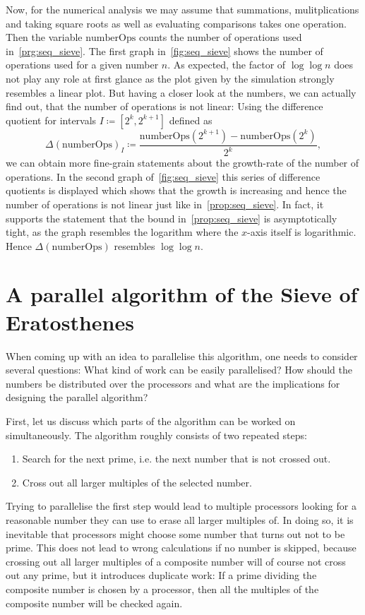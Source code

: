 \documentclass[a4paper,12pt]{article}
\begin{document}
Now, for the numerical analysis we may assume that summations, mulitplications and taking square roots as well as evaluating comparisons takes one operation.
Then the variable $\mathrm{numberOps}$ counts the number of operations used in~\autoref{prg:seq_sieve}.
The first graph in~\autoref{fig:seq_sieve} shows the number of operations used for a given number $n$.
As expected, the factor of $\log\log n$ does not play any role at first glance as the plot given by the simulation strongly resembles a linear plot.
But having a closer look at the numbers, we can actually find out, that the number of operations is not linear:
Using the difference quotient for intervals $I\coloneqq [2^k, 2^{k+1}]$ defined as
\[\Delta(\mathrm{numberOps})_I\coloneqq \frac{\mathrm{numberOps}(2^{k+1}) - \mathrm{numberOps}(2^{k})}{2^k},\]
we can obtain more fine-grain statements about the growth-rate of the number of operations.
In the second graph of~\autoref{fig:seq_sieve} this series of difference quotients is displayed which shows that the growth is increasing and hence the number of operations is not linear just like in~\autoref{prop:seq_sieve}.
In fact, it supports the statement that the bound in~\autoref{prop:seq_sieve} is asymptotically tight, as the graph resembles the logarithm where the $x$-axis itself is logarithmic.
Hence $\Delta(\mathrm{numberOps})$ resembles $\log\log n$.


\section{A parallel algorithm of the Sieve of Eratosthenes}

When coming up with an idea to parallelise this algorithm, one needs to consider several questions:
What kind of work can be easily parallelised?
How should the numbers be distributed over the processors and what are the implications for designing the parallel algorithm?

First, let us discuss which parts of the algorithm can be worked on simultaneously.
The algorithm roughly consists of two repeated steps:
\begin{enumerate}
	\item Search for the next prime, i.e. the next number that is not crossed out.
	\item Cross out all larger multiples of the selected number.
\end{enumerate}
Trying to parallelise the first step would lead to multiple processors looking for a reasonable number they can use to erase all larger multiples of.
In doing so, it is inevitable that processors might choose some number that turns out not to be prime.
This does not lead to wrong calculations if no number is skipped, because crossing out all larger multiples of a composite number will of course not cross out any prime, but it introduces duplicate work:
If a prime dividing the composite number is chosen by a processor, then all the multiples of the composite number will be checked again.
\end{document}
